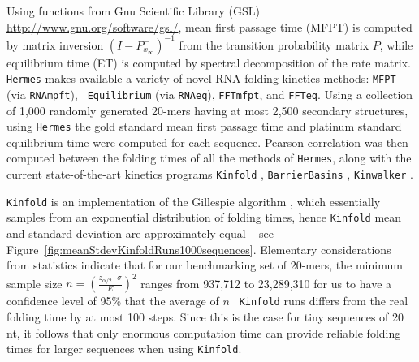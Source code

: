 Using functions from Gnu Scientific Library (GSL)
\url{http://www.gnu.org/software/gsl/}, mean first passage time
(MFPT) is computed by matrix inversion
$(I - P^{-}_{x_{\infty}})^{-1}$ from the transition probability matrix
$P$, while equilibrium time (ET) is computed by spectral
decomposition of the rate matrix. {\tt Hermes} makes available a
variety of novel RNA folding kinetics methods: {\tt MFPT} (via {\tt RNAmpft}), {\tt
Equilibrium} (via {\tt RNAeq}), {\tt FFTmfpt}, and {\tt FFTeq}.
Using a collection of 1,000 randomly generated 20-mers having at most
2,500 secondary structures, using {\tt Hermes} the gold standard
mean first passage time and platinum standard equilibrium time were
computed for each sequence.
Pearson correlation was then computed
between the folding times of all the methods of {\tt Hermes}, along
with the current state-of-the-art kinetics programs {\tt Kinfold}
\cite{flamm}, {\tt BarrierBasins} \cite{wolfingerStadler:kinetics},
{\tt Kinwalker} \cite{Geis.jmb08}.

{\tt Kinfold} is an implementation
of the Gillespie algorithm \cite{gillespieStochasticSimulation1},
which essentially samples from an exponential distribution of folding
times, hence {\tt Kinfold} mean and standard deviation are
approximately equal -- see
Figure~\ref{fig:meanStdevKinfoldRuns1000sequences}. Elementary
considerations from statistics indicate that for our benchmarking set
of 20-mers, the minimum sample size $n = \left( \frac{z_{\alpha/2}
\cdot \sigma}{E} \right)^2$ ranges from 937,712 to 23,289,310 for us
to have a confidence level of 95\% that the average of $n$ {\tt
Kinfold} runs differs from the real folding time by at most 100 steps.
Since this is the case for tiny sequences of 20 nt, it follows that
only enormous computation time can provide reliable folding times for
larger sequences when using {\tt Kinfold}.

